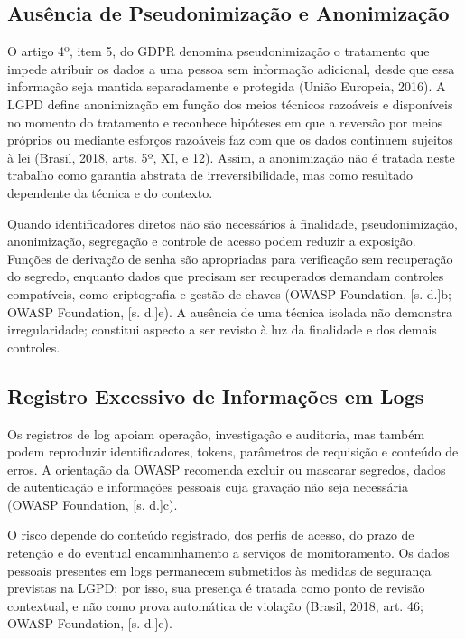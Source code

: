 \documentclass[12pt,a4paper,oneside]{report}
\begin{document}
\subsection{Ausência de Pseudonimização e Anonimização}

O artigo 4º, item 5, do GDPR denomina pseudonimização o tratamento que impede atribuir os dados a uma pessoa sem informação adicional, desde que essa informação seja mantida separadamente e protegida (União Europeia, 2016). A LGPD define anonimização em função dos meios técnicos razoáveis e disponíveis no momento do tratamento e reconhece hipóteses em que a reversão por meios próprios ou mediante esforços razoáveis faz com que os dados continuem sujeitos à lei (Brasil, 2018, arts. 5º, XI, e 12). Assim, a anonimização não é tratada neste trabalho como garantia abstrata de irreversibilidade, mas como resultado dependente da técnica e do contexto.

Quando identificadores diretos não são necessários à finalidade, pseudonimização, anonimização, segregação e controle de acesso podem reduzir a exposição. Funções de derivação de senha são apropriadas para verificação sem recuperação do segredo, enquanto dados que precisam ser recuperados demandam controles compatíveis, como criptografia e gestão de chaves (OWASP Foundation, [s. d.]b; OWASP Foundation, [s. d.]e). A ausência de uma técnica isolada não demonstra irregularidade; constitui aspecto a ser revisto à luz da finalidade e dos demais controles.

\subsection{Registro Excessivo de Informações em Logs}

Os registros de log apoiam operação, investigação e auditoria, mas também podem reproduzir identificadores, tokens, parâmetros de requisição e conteúdo de erros. A orientação da OWASP recomenda excluir ou mascarar segredos, dados de autenticação e informações pessoais cuja gravação não seja necessária (OWASP Foundation, [s. d.]c).

O risco depende do conteúdo registrado, dos perfis de acesso, do prazo de retenção e do eventual encaminhamento a serviços de monitoramento. Os dados pessoais presentes em logs permanecem submetidos às medidas de segurança previstas na LGPD; por isso, sua presença é tratada como ponto de revisão contextual, e não como prova automática de violação (Brasil, 2018, art. 46; OWASP Foundation, [s. d.]c).
\end{document}
